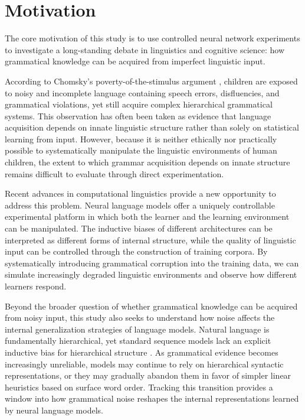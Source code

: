 \section{Motivation}
\label{sec:motivation}

The core motivation of this study is to use controlled neural network experiments to investigate a long-standing debate in linguistics and cognitive science: how grammatical knowledge can be acquired from imperfect linguistic input.

According to Chomsky's poverty-of-the-stimulus argument \citep{chomsky1965, chomsky1980}, children are exposed to noisy and incomplete language containing speech errors, disfluencies, and grammatical violations, yet still acquire complex hierarchical grammatical systems. This observation has often been taken as evidence that language acquisition depends on innate linguistic structure rather than solely on statistical learning from input. However, because it is neither ethically nor practically possible to systematically manipulate the linguistic environments of human children, the extent to which grammar acquisition depends on innate structure remains difficult to evaluate through direct experimentation.

Recent advances in computational linguistics provide a new opportunity to address this problem. Neural language models offer a uniquely controllable experimental platform in which both the learner and the learning environment can be manipulated. The inductive biases of different architectures can be interpreted as different forms of internal structure, while the quality of linguistic input can be controlled through the construction of training corpora. By systematically introducing grammatical corruption into the training data, we can simulate increasingly degraded linguistic environments and observe how different learners respond.

Beyond the broader question of whether grammatical knowledge can be acquired from noisy input, this study also seeks to understand how noise affects the internal generalization strategies of language models. Natural language is fundamentally hierarchical, yet standard sequence models lack an explicit inductive bias for hierarchical structure \citep{shen2019}. As grammatical evidence becomes increasingly unreliable, models may continue to rely on hierarchical syntactic representations, or they may gradually abandon them in favor of simpler linear heuristics based on surface word order. Tracking this transition provides a window into how grammatical noise reshapes the internal representations learned by neural language models.

